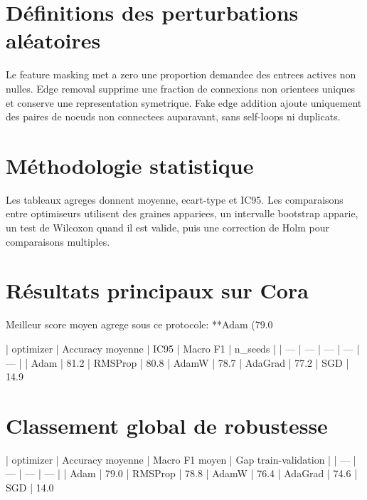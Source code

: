 \documentclass[11pt,a4paper]{article}
\begin{document}
\section{Définitions des perturbations aléatoires}
\par
Le feature masking met a zero une proportion demandee des entrees actives non nulles. Edge removal supprime une fraction de connexions non orientees uniques et conserve une representation symetrique. Fake edge addition ajoute uniquement des paires de noeuds non connectees auparavant, sans self-loops ni duplicats.
\par
\section{Méthodologie statistique}
\par
Les tableaux agreges donnent moyenne, ecart-type et IC95. Les comparaisons entre optimiseurs utilisent des graines appariees, un intervalle bootstrap apparie, un test de Wilcoxon quand il est valide, puis une correction de Holm pour comparaisons multiples.
\par
\section{Résultats principaux sur Cora}
\par
Meilleur score moyen agrege sous ce protocole: **Adam (79.0%
\par
| optimizer | Accuracy moyenne | IC95 | Macro F1 | n_seeds |
| --- | --- | --- | --- | --- |
| Adam | 81.2%
| RMSProp | 80.8%
| AdamW | 78.7%
| AdaGrad | 77.2%
| SGD | 14.9%
\par
\section{Classement global de robustesse}
\par
| optimizer | Accuracy moyenne | Macro F1 moyen | Gap train-validation |
| --- | --- | --- | --- |
| Adam | 79.0%
| RMSProp | 78.8%
| AdamW | 76.4%
| AdaGrad | 74.6%
| SGD | 14.0%
\par
\end{document}
